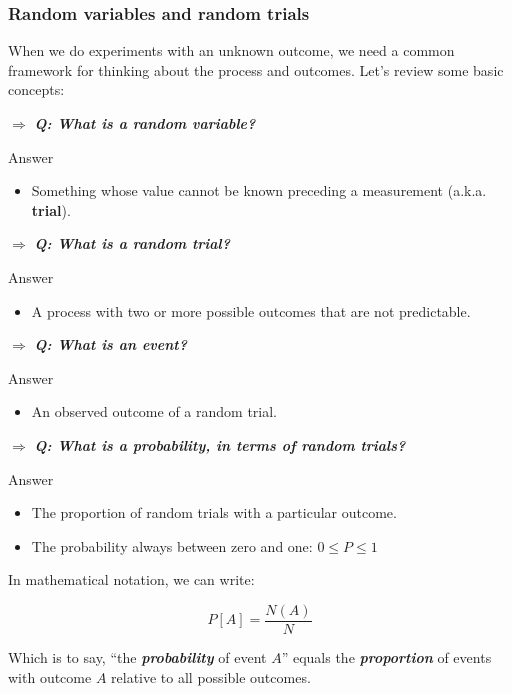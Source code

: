 \documentclass[
]{article}
\providecommand{\tightlist}{%
  \setlength{\itemsep}{0pt}\setlength{\parskip}{0pt}}
\begin{document}
\hypertarget{random-variables-and-random-trials}{%
\subsubsection{Random variables and random
trials}\label{random-variables-and-random-trials}}

When we do experiments with an unknown outcome, we need a common
framework for thinking about the process and outcomes. Let's review some
basic concepts:

\(\Rightarrow\) \textbf{\emph{Q: What is a random variable?}}

Answer

\begin{itemize}
\tightlist
\item
  Something whose value cannot be known preceding a measurement (a.k.a.
  \textbf{trial}).
\end{itemize}

\(\Rightarrow\) \textbf{\emph{Q: What is a random trial?}}

Answer

\begin{itemize}
\tightlist
\item
  A process with two or more possible outcomes that are not predictable.
\end{itemize}

\(\Rightarrow\) \textbf{\emph{Q: What is an event?}}

Answer

\begin{itemize}
\tightlist
\item
  An observed outcome of a random trial.
\end{itemize}

\(\Rightarrow\) \textbf{\emph{Q: What is a probability, in terms of
random trials?}}

Answer

\begin{itemize}
\tightlist
\item
  The proportion of random trials with a particular outcome.
\item
  The probability always between zero and one: \(0 \le P \le 1\)
\end{itemize}

In mathematical notation, we can write:

\[P[A] = \frac{N(A)}{N}\]

Which is to say, ``the \textbf{\emph{probability}} of event \(A\)''
equals the \textbf{\emph{proportion}} of events with outcome \(A\)
relative to all possible outcomes.
\end{document}
